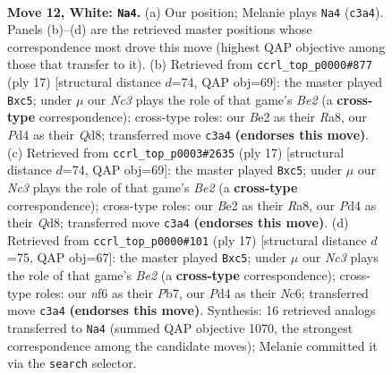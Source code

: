 \documentclass[11pt]{article}
\begin{document}
\clearpage

\begin{figure}[p]\centering
\begin{subfigure}{0.46\textwidth}\centering
\resizebox{\linewidth}{!}{%
\newchessgame
\chessboard[
  setfen={rnqb1rk1/pp1b1ppp/4pn2/2Pp4/3P4/2N2N2/PP1BBPPP/2RQ1RK1 w - - 9 12},
  showmover=false,
  pgfstyle=straightmove, color=movearrow, markmove={c3-a4}
]}
\caption{}
\end{subfigure}\hfill
\begin{subfigure}{0.46\textwidth}\centering
\resizebox{\linewidth}{!}{%
\newchessgame
\chessboard[
  setfen={r1bq1rk1/pp2bppp/2n2n2/2Pp4/8/2N2NP1/PPP2PBP/R1BQ1RK1 b - - 0 9},
  showmover=false,
  pgfstyle=straightmove, color=movearrow, markmove={e7-c5}
]}
\caption{}
\end{subfigure}
\\[4pt]
\begin{subfigure}{0.46\textwidth}\centering
\resizebox{\linewidth}{!}{%
\newchessgame
\chessboard[
  setfen={r1bq1rk1/pp2bppp/2n2n2/2Pp4/8/2N2NP1/PPP2PBP/R1BQ1RK1 b - - 0 9},
  showmover=false,
  pgfstyle=straightmove, color=movearrow, markmove={e7-c5}
]}
\caption{}
\end{subfigure}\hfill
\begin{subfigure}{0.46\textwidth}\centering
\resizebox{\linewidth}{!}{%
\newchessgame
\chessboard[
  setfen={r1bq1rk1/pp2bppp/2n2n2/2Pp4/8/2N2NP1/PP2PPBP/R1BQ1RK1 b - - 0 9},
  showmover=false,
  pgfstyle=straightmove, color=movearrow, markmove={e7-c5}
]}
\caption{}
\end{subfigure}
\caption{\textbf{Move 12, White: \texttt{Na4}.} (a) Our position; Melanie plays \texttt{Na4} (\texttt{c3a4}). Panels (b)--(d) are the retrieved master positions whose correspondence most drove this move (highest QAP objective among those that transfer to it). (b) Retrieved from \texttt{ccrl\_top\_p0000\#877} (ply 17) [structural distance $d$=74, QAP obj=69]: the master played \texttt{Bxc5}; under $\mu$ our \emph{Nc3} plays the role of that game's \emph{Be2} (a \textbf{cross-type} correspondence); cross-type roles: our \emph{B}e2 as their \emph{R}a8, our \emph{P}d4 as their \emph{Q}d8; transferred move \texttt{c3a4} \textbf{(endorses this move)}. (c) Retrieved from \texttt{ccrl\_top\_p0003\#2635} (ply 17) [structural distance $d$=74, QAP obj=69]: the master played \texttt{Bxc5}; under $\mu$ our \emph{Nc3} plays the role of that game's \emph{Be2} (a \textbf{cross-type} correspondence); cross-type roles: our \emph{B}e2 as their \emph{R}a8, our \emph{P}d4 as their \emph{Q}d8; transferred move \texttt{c3a4} \textbf{(endorses this move)}. (d) Retrieved from \texttt{ccrl\_top\_p0000\#101} (ply 17) [structural distance $d$=75, QAP obj=67]: the master played \texttt{Bxc5}; under $\mu$ our \emph{Nc3} plays the role of that game's \emph{Be2} (a \textbf{cross-type} correspondence); cross-type roles: our \emph{n}f6 as their \emph{P}b7, our \emph{P}d4 as their \emph{N}c6; transferred move \texttt{c3a4} \textbf{(endorses this move)}. Synthesis: 16 retrieved analogs transferred to \texttt{Na4} (summed QAP objective 1070, the strongest correspondence among the candidate moves); Melanie committed it via the \texttt{search} selector.}
\label{fig:thought-m22}
\end{figure}
\end{document}
